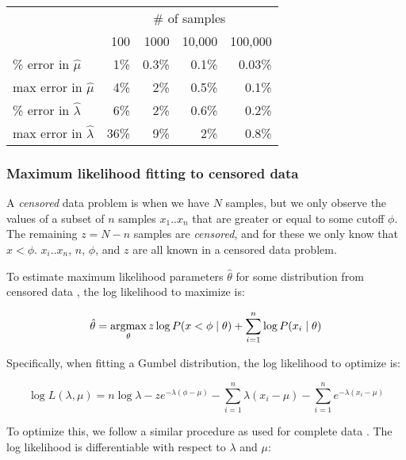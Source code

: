 \begin{center}
\begin{tabular}{lrrrr} \hline
                              & \multicolumn{4}{c}{\# of samples}\\
                              & 100 & 1000  & 10,000 & 100,000 \\
\% error in $\hat{\mu}$       &  1\%& 0.3\% &  0.1\% & 0.03\%  \\
max error in $\hat{\mu}$      &  4\%&   2\% &  0.5\% &  0.1\%  \\
\% error in $\hat{\lambda}$   &  6\%&   2\% &  0.6\% &  0.2\%  \\
max error in $\hat{\lambda}$  & 36\%&   9\% &    2\% &  0.8\%  \\ \hline
\end{tabular}
\end{center}





\subsubsection{Maximum likelihood fitting to censored data}

A \emph{censored} data problem is when we have $N$ samples, but we
only observe the values of a subset of $n$ samples $x_1..x_n$ that are
greater or equal to some cutoff $\phi$. The remaining $z = N-n$
samples are \emph{censored}, and for these we only know that $x <
\phi$.  $x_i..x_n$, $n$, $\phi$, and $z$ are all known in a censored
data problem.

To estimate maximum likelihood parameters $\hat{\theta}$ for some
distribution from censored data \citep{Gelman95}, the log likelihood
to maximize is:


\[ 
  \hat{\theta} = \mathop{\mathrm{argmax}}\limits_{\theta} z \log P(x<\phi \mid \theta)
                         + \sum_{i=1}^n \log P(x_i \mid \theta)
\]

Specifically, when fitting a Gumbel distribution, the log likelihood
to optimize is:

\begin{equation}
  \log L(\lambda, \mu) = 
    n \log \lambda 
     - z e^{-\lambda(\phi - \mu)}
     - \sum_{i=1}^{n} \lambda(x_i - \mu) 
     - \sum_{i=1}^{n} e^{-\lambda(x_i - \mu)}
\label{eqn:censor_logL}
\end{equation}

To optimize this, we follow a similar procedure as used for complete
data \citep{Lawless82}. The log likelihood is differentiable with
respect to $\lambda$ and $\mu$:

